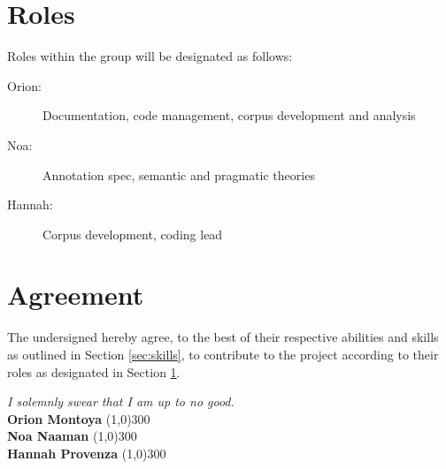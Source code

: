 \documentclass{article}
\newcommand{\groupmember}[1]{#1}
\newcommand{\role}[1]{#1}
\newcommand{\sigline}[2]{\vspace{2em} #1 \hfill \line(1,0){#2}}
\begin{document}
\section{Roles} %
\label{sec:roles}

Roles within the group will be designated as follows:

\begin{description}
    \item[\role{Orion}:] Documentation, code management, corpus development and analysis
    \item[\role{Noa}:] Annotation spec, semantic and pragmatic theories
    \item[\role{Hannah}:] Corpus development, coding lead
\end{description}

\section{Agreement} %
\label{par:agreement}
The undersigned hereby agree, to the best of their respective abilities and skills
as outlined in Section \ref{sec:skills}, to contribute to the project according to
their roles as designated in Section \ref{sec:roles}.

\textit{I solemnly swear that I am up to no good.}
\vspace{2em}\\
\sigline{\textbf{\groupmember{Orion Montoya}}}{300}\\
\sigline{\textbf{\groupmember{Noa Naaman}}}{300}\\
\sigline{\textbf{\groupmember{Hannah Provenza}}}{300}\\
\end{document}
